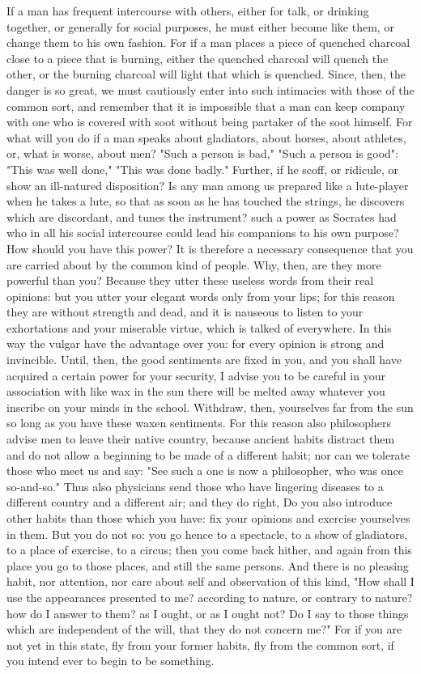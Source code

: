 \documentclass[a4paper]{article}
\begin{document}
    If a man has frequent intercourse with others, either for talk, or drinking
together, or generally for social purposes, he must either become like them, or
change them to his own fashion. For if a man places a piece of quenched
charcoal close to a piece that is burning, either the quenched charcoal will
quench the other, or the burning charcoal will light that which is quenched.
Since, then, the danger is so great, we must cautiously enter into such
intimacies with those of the common sort, and remember that it is impossible
that a man can keep company with one who is covered with soot without being
partaker of the soot himself. For what will you do if a man speaks about
gladiators, about horses, about athletes, or, what is worse, about men? "Such a
person is bad," "Such a person is good": "This was well done," "This was done
badly." Further, if he scoff, or ridicule, or show an ill-natured disposition?
Is any man among us prepared like a lute-player when he takes a lute, so that
as soon as he has touched the strings, he discovers which are discordant, and
tunes the instrument? such a power as Socrates had who in all his social
intercourse could lead his companions to his own purpose? How should you have
this power? It is therefore a necessary consequence that you are carried about
by the common kind of people.
    Why, then, are they more powerful than you? Because they utter these
useless words from their real opinions: but you utter your elegant words only
from your lips; for this reason they are without strength and dead, and it is
nauseous to listen to your exhortations and your miserable virtue, which is
talked of everywhere. In this way the vulgar have the advantage over you: for
every opinion is strong and invincible. Until, then, the good sentiments are
fixed in you, and you shall have acquired a certain power for your security, I
advise you to be careful in your association with like wax in the sun there
will be melted away whatever you inscribe on your minds in the school.
Withdraw, then, yourselves far from the sun so long as you have these waxen
sentiments. For this reason also philosophers advise men to leave their native
country, because ancient habits distract them and do not allow a beginning to
be made of a different habit; nor can we tolerate those who meet us and say:
"See such a one is now a philosopher, who was once so-and-so." Thus also
physicians send those who have lingering diseases to a different country and a
different air; and they do right, Do you also introduce other habits than those
which you have: fix your opinions and exercise yourselves in them. But you do
not so: you go hence to a spectacle, to a show of gladiators, to a place of
exercise, to a circus; then you come back hither, and again from this place you
go to those places, and still the same persons. And there is no pleasing habit,
nor attention, nor care about self and observation of this kind, "How shall I
use the appearances presented to me? according to nature, or contrary to
nature? how do I answer to them? as I ought, or as I ought not? Do I say to
those things which are independent of the will, that they do not concern me?"
For if you are not yet in this state, fly from your former habits, fly from the
common sort, if you intend ever to begin to be something.
\end{document}
